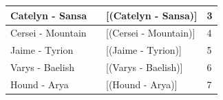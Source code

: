 \documentclass[10pt,a4paper]{article}
\begin{document}
\begin{enumerate}
\begin{table}[H]
\begin{tabular}{|l|l|l|l|}
		Catelyn - Sansa   &       & {[}\textcolor{spirodiscoball}{(Catelyn - Sansa)}{]}   &3                                                                                                                                                                                                                                                                                                                                                                                                                                                                           \\ \hline
		Cersei - Mountain &       & {[}(\textcolor{smalt}{Cersei - Mountain)}{]} &4                                                                                                                                                                                                                                                                                                                                                                                                                                                                           \\ \hline
		Jaime - Tyrion    &       & {[}(Jaime - Tyrion){]}   &5                                                                                                                                                                                                                                                                                                                                                                                                                                                                            \\ \hline
		Varys - Baelish   &       & {[}(Varys - Baelish){]} &6                                                                                                                                                                                                                                                                                                                                                                                                                                                                            \\ \hline
		Hound - Arya      &       & {[}(Hound - Arya){]}    &7                                                                                                                                                                                                                                                                                                                                                                                                                                                                             \\ \hline

\end{tabular}
\end{table}
\end{enumerate}
\end{document}
